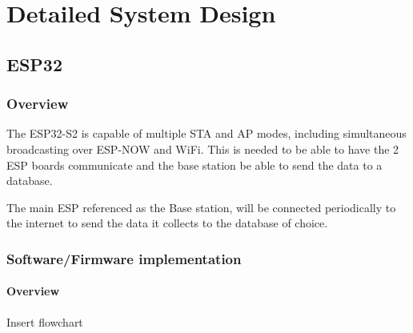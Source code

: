 \chapter{Detailed System Design}
\section{ESP32}

\subsection{Overview}
The ESP32-S2 is capable of multiple STA and AP modes, including simultaneous broadcasting over ESP-NOW and WiFi. This is needed to be able to have the 2 ESP boards communicate and the base station be able to send the data to a database.

\noindent
The main ESP referenced as the Base station, will be connected periodically to the internet to send the data it collects to the database of choice. 

\subsection{Software/Firmware implementation}
\subsubsection{Overview}
{\color{red} \huge Insert flowchart}

